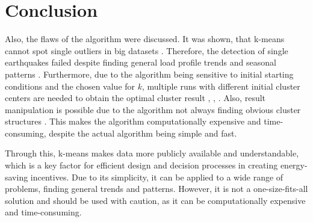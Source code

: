 \section{Conclusion}
\label{cha:conclusion}







Also, the flaws of the algorithm were discussed.
It was shown, that k-means cannot spot single outliers in big datasets \cite{JES-IND}.
Therefore, the detection of single earthquakes failed despite finding general load profile trends and seasonal patterns \cite{JES-IND}.
Furthermore, due to the algorithm being sensitive to initial starting conditions and the chosen value for $k$, multiple runs with different initial cluster centers are needed to obtain the optimal cluster result \cite{JAI-DCB}, \cite{EZU-CPF}, \cite{BAR-LVG}.
Also, result manipulation is possible due to the algorithm not always finding obvious cluster structures \cite{BOU-RPK}.
This makes the algorithm computationally expensive and time-consuming, despite the actual algorithm being simple and fast.

Through this, k-means makes data more publicly available and understandable, which is a key factor for efficient design and decision processes in creating energy-saving incentives.
Due to its simplicity, it can be applied to a wide range of problems, finding general trends and patterns.
However, it is not a one-size-fits-all solution and should be used with caution, as it can be computationally expensive and time-consuming.

